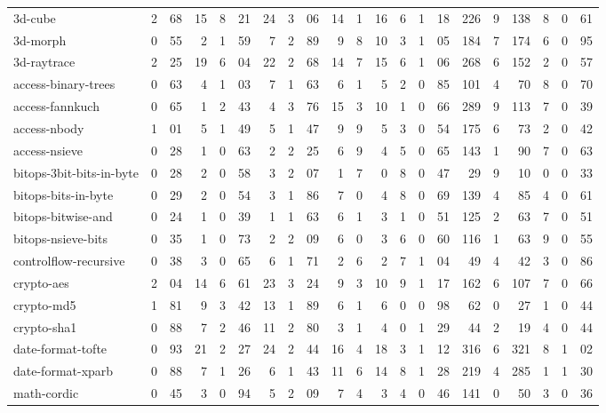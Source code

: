 \begin{figure*}
\begin{center}
\begin{tabular}{lr@{.}lrr@{.}lrr@{.}lr@{.}lr@{.}lr@{.}lr@{.}lr@{.}lr@{.}l}
3d-cube                  & 2&68 & 15 & 8&21 & 24 & 3&06
    & 14&1 & 16&6 & 1&18 & 226&9 & 138&8 & 0&61 \\
3d-morph                 & 0&55 & 2   & 1&59 & 7  & 2&89 
    & 9&8  & 10&3 & 1&05 & 184&7 & 174&6 & 0&95 \\
3d-raytrace              & 2&25 & 19 & 6&04 & 22 & 2&68
    & 14&7 & 15&6 & 1&06 & 268&6 & 152&2 & 0&57 \\
access-binary-trees      & 0&63 & 4   & 1&03 & 7  & 1&63
    & 6&1  & 5&2 & 0&85   & 101&4 & 70&8  & 0&70 \\
access-fannkuch          & 0&65  & 1  & 2&43 & 4  & 3&76
    & 15&3 & 10&1 & 0&66  & 289&9 & 113&7 & 0&39 \\
access-nbody             & 1&01 & 5  & 1&49 & 5  & 1&47
    & 9&9  & 5&3 & 0&54   & 175&6 & 73&2  & 0&42 \\
access-nsieve            & 0&28 & 1   & 0&63 & 2   & 2&25
    & 6&9  & 4&5 & 0&65   & 143&1 & 90&7  & 0&63 \\
bitops-3bit-bits-in-byte & 0&28 & 2   & 0&58 & 3   & 2&07
    & 1&7  & 0&8 & 0&47    & 29&9 & 10&0   & 0&33 \\
bitops-bits-in-byte      & 0&29 & 2   & 0&54 & 3   & 1&86
    & 7&0  & 4&8 & 0&69   & 139&4 & 85&4  & 0&61 \\
bitops-bitwise-and       & 0&24 & 1   & 0&39 & 1   & 1&63
    & 6&1  & 3&1 & 0&51   & 125&2 & 63&7  & 0&51 \\
bitops-nsieve-bits       & 0&35 & 1   & 0&73 & 2   & 2&09
    & 6&0  & 3&6 & 0&60    & 116&1 & 63&9  & 0&55 \\
controlflow-recursive    & 0&38 & 3   & 0&65 & 6   & 1&71
    & 2&6  & 2&7 & 1&04  & 49&4  & 42&3  & 0&86 \\
crypto-aes               & 2&04 & 14 & 6&61 & 23 & 3&24
    & 9&3  & 10&9 & 1&17 & 162&6 & 107&7 & 0&66 \\
crypto-md5               & 1&81 & 9  & 3&42 & 13 & 1&89
    & 6&1  & 6&0 & 0&98   & 62&0  & 27&1  & 0&44 \\
crypto-sha1              & 0&88 & 7   & 2&46 & 11 & 2&80
    & 3&1  & 4&0 & 1&29  & 44&2  & 19&4  & 0&44 \\
date-format-tofte        & 0&93 & 21  & 2&27 & 24 & 2&44
    & 16&4 & 18&3 & 1&12 & 316&6 & 321&8 & 1&02 \\
date-format-xparb        & 0&88 & 7   & 1&26 & 6  & 1&43
    & 11&6 & 14&8 & 1&28 & 219&4 & 285&1 & 1&30 \\
math-cordic              & 0&45 & 3   & 0&94 & 5   & 2&09
    & 7&4  & 3&4 & 0&46   & 141&0 & 50&3  & 0&36 \\

\end{tabular}
\end{center}
\end{figure*}
